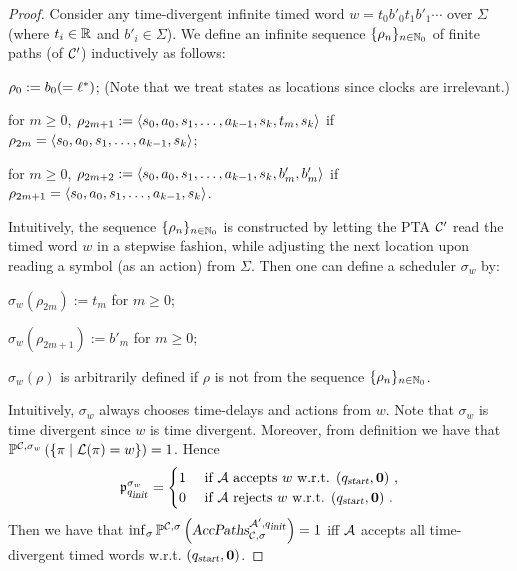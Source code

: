 \begin{proof}
Consider any time-divergent infinite timed word $ w = t_0 b'_0 t_1 b'_1 \cdots $ over $\Sigma$ (where $t_i\in\mathbb{R}$ and $b'_i\in\Sigma$).
We define an infinite sequence $\{\rho_n\}_{n\in\mathbb{N}_0}$ of finite paths (of $\mathcal{C}'$) inductively as follows:
\begin{compactitem}
\item $\rho_0:=b_0(=\ell^*)$; (Note that we treat states as locations since clocks are irrelevant.)
\item for $m\ge 0$, $\rho_{2m+1}:=\left\langle s_0,a_0,s_1,\dots,a_{k-1},s_{k},t_{m}, s_{k}\right\rangle$ if $\rho_{2m}=\left\langle s_0,a_0,s_1,\dots,a_{k-1},s_{k}\right\rangle$;
\item for $m\ge 0$, $\rho_{2m+2}:=\left\langle s_0,a_0,s_1,\dots,a_{k-1},s_{k},b'_{m}, b'_m\right\rangle$ if $\rho_{2m+1}=\left\langle s_0,a_0,s_1,\dots,a_{k-1},s_{k}\right\rangle$.
\end{compactitem}
Intuitively, the sequence $\{\rho_n\}_{n\in\mathbb{N}_0}$ is constructed by letting the PTA $\mathcal{C}'$ read the timed word $w$ in a stepwise fashion, while adjusting the next location upon reading a symbol (as an action) from $\Sigma$.
Then one can define a scheduler $\sigma_w$ by:
\begin{compactitem}
\item $\sigma_w(\rho_{2m}):=t_m$ for $m\ge 0$;
\item $\sigma_w(\rho_{2m+1}):=b'_{m}$ for $m\ge 0$;
\item $\sigma_w(\rho)$ is arbitrarily defined if $\rho$ is not from the sequence $\{\rho_n\}_{n\in\mathbb{N}_0}$.
\end{compactitem}
Intuitively, $\sigma_w$ always chooses time-delays and actions from $w$.
Note that $\sigma_w$ is time divergent since $w$ is time divergent.
Moreover, from definition we have that
$
    \mathbb{P}^{\mathcal{C},\sigma_w }\left(
        \left \{\pi\mid \mathcal{L}(\pi)=w
        \right \}
    \right)
    = 1
$.
Hence
$$
    \mathfrak{p}_{q_{\mbox{\sl\scriptsize init} }}^{\sigma_w}
        =   \begin{cases}
            1 & \mbox{ if $\mathcal{A}$ accepts $w$ w.r.t. $(q_{\mbox{\sl\scriptsize start}},\mathbf{0})$ },\\
            0 & \mbox{ if $\mathcal{A}$ rejects $w$ w.r.t. $(q_{\mbox{\sl\scriptsize start}},\mathbf{0})$ }.
        \end{cases}
$$
Then we have that
$
\inf_\sigma \mathbb{P}^{\mathcal{C},\sigma}\left(
    \mbox{\sl AccPaths} _{\mathcal{C},\sigma} ^{\mathcal{A}',q_{\mbox{\sl\scriptsize init} }}
\right)
    = 1
$
iff
$\mathcal{A}$ accepts all time-divergent timed words w.r.t. $(q_{\mbox{\sl\scriptsize start}},\mathbf{0})$.
\end{proof}


